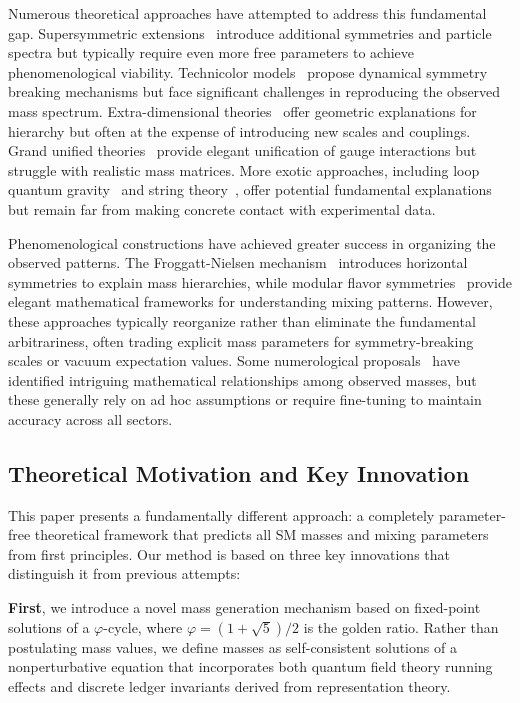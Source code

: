 \documentclass[%
amsmath,amssymb,
aps,
prb,
floatfix,
twocolumn
]{revtex4-2}
\begin{document}
Numerous theoretical approaches have attempted to address this fundamental gap. Supersymmetric extensions~\cite{dine-1993,Wess1974} introduce additional symmetries and particle spectra but typically require even more free parameters to achieve phenomenological viability. Technicolor models~\cite{Susskind1979,hill-2003,technicolor-2015} propose dynamical symmetry breaking mechanisms but face significant challenges in reproducing the observed mass spectrum. Extra-dimensional theories~\cite{Randall1999} offer geometric explanations for hierarchy but often at the expense of introducing new scales and couplings. Grand unified theories~\cite{grand-uni-th-2015} provide elegant unification of gauge interactions but struggle with realistic mass matrices. More exotic approaches, including loop quantum gravity~\cite{Rovelli2004,loop-qg} and string theory~\cite{polchinski-1998}, offer potential fundamental explanations but remain far from making concrete contact with experimental data.

Phenomenological constructions have achieved greater success in organizing the observed patterns. The Froggatt-Nielsen mechanism~\cite{frog-1979,fritz-2000} introduces horizontal symmetries to explain mass hierarchies, while modular flavor symmetries~\cite{petcov} provide elegant mathematical frameworks for understanding mixing patterns. However, these approaches typically reorganize rather than eliminate the fundamental arbitrariness, often trading explicit mass parameters for symmetry-breaking scales or vacuum expectation values. Some numerological proposals~\cite{koide-1983,eln-2002,eln-2002-1,cascade-2003} have identified intriguing mathematical relationships among observed masses, but these generally rely on ad hoc assumptions or require fine-tuning to maintain accuracy across all sectors.

\subsection{Theoretical Motivation and Key Innovation}

This paper presents a fundamentally different approach: a completely parameter-free theoretical framework that predicts all SM masses and mixing parameters from first principles. Our method is based on three key innovations that distinguish it from previous attempts:

\textbf{First}, we introduce a novel mass generation mechanism based on fixed-point solutions of a $\varphi$-cycle, where $\varphi = (1+\sqrt{5})/2$ is the golden ratio. Rather than postulating mass values, we define masses as self-consistent solutions of a nonperturbative equation that incorporates both quantum field theory running effects and discrete ledger invariants derived from representation theory.
\end{document}
